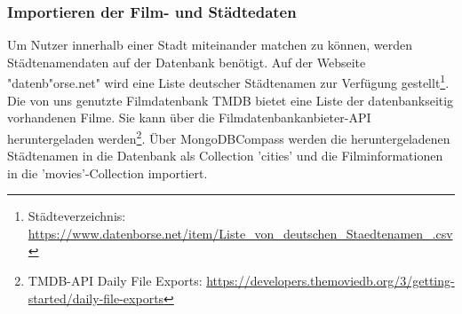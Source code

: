 \subsubsection{Importieren der Film- und Städtedaten}
Um Nutzer innerhalb einer Stadt miteinander matchen zu können, werden Städtenamendaten auf der Datenbank benötigt. Auf der Webseite "datenb"orse.net" wird eine Liste deutscher Städtenamen zur Verfügung gestellt\footnote{Städteverzeichnis: \url{https://www.datenborse.net/item/Liste\_von\_deutschen\_Staedtenamen\_.csv}}.
Die von uns genutzte Filmdatenbank TMDB bietet eine Liste der datenbankseitig vorhandenen Filme. Sie kann über die Filmdatenbankanbieter-API heruntergeladen werden\footnote{TMDB-API Daily File Exports: \url{https://developers.themoviedb.org/3/getting-started/daily-file-exports}}. 
Über MongoDBCompass werden die heruntergeladenen Städtenamen in die Datenbank als Collection 'cities' und die Filminformationen in die 'movies'-Collection importiert.